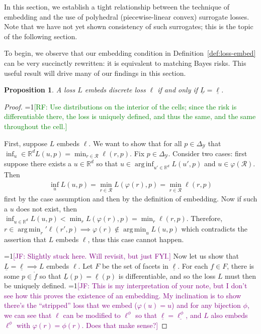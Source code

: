 \documentclass[12pt]{article}
\newcommand{\Comments}{1}
\newcommand{\mynote}[2]{\ifnum\Comments=1\textcolor{#1}{#2}\fi}
\newcommand{\raf}[1]{\mynote{green}{[RF: #1]}}
\newcommand{\jessie}[1]{\mynote{purple}{[JF: #1]}}
\newcommand{\reals}{\mathbb{R}}
\newcommand{\simplex}{\Delta_\Y}
\newcommand{\R}{\mathcal{R}}
\newcommand{\Y}{\mathcal{Y}}
\newcommand{\risk}[1]{\underline{#1}}
\newcommand{\inter}[1]{\mathring{#1}}%
\DeclareMathOperator*{\argmin}{arg\,min}
\DeclareMathOperator*{\arginf}{arg\,inf}
\newtheorem{proposition}{Proposition}
\begin{document}
In this section, we establish a tight relationship between the technique of embedding and the use of polyhedral (piecewise-linear convex) surrogate losses.
Note that we have not yet shown consistency of such surrogates; this is the topic of the following section.

To begin, we observe that our embedding condition in Definition~\ref{def:loss-embed} can be very succinctly rewritten: it is equivalent to matching Bayes risks.
This useful result will drive many of our findings in this section.

\begin{proposition}\label{prop:embed-bayes-risks}
  A loss $L$ embeds discrete loss $\ell$ if and only if $\risk{L}=\risk{\ell}$.
\end{proposition}
\begin{proof}
  \raf{Use distributions on the interior of the cells; since the risk is differentiable there, the loss is uniquely defined, and thus the same, and the same throughout the cell.}
  
  First, suppose $L$ embeds $\ell$.
  We want to show that for all $p \in \simplex$ that $\inf_u\in\reals^d L(u,p) = \min_{r \in \R} \ell(r, p)$.
  Fix $p \in \simplex$.
  Consider two cases: first suppose there exists a $u \in \reals^d$ so that $u \in \arginf_{u' \in \reals^d}L(u',p)$ and $u \in \varphi(\R)$.
  Then 
  \begin{align*}
  \inf_u L(u,p) = \min_{r \in \R} L(\varphi(r), p) = \min_{r \in \R} \ell(r, p)
  \end{align*}
   first by the case assumption and then by the definition of embedding.
  Now if such a $u$ does not exist, then $\inf_{u \in \reals^d}L(u,p) < \min_r L(\varphi(r), p) = \min_r \ell(r,p)$.
  Therefore, $r \in \argmin_r' \ell(r', p) \implies \varphi(r) \not \in \argmin_u L(u,p)$ which contradicts the assertion that $L$ embeds $\ell$, thus this case cannot happen.
  
  \jessie{Slightly stuck here.  Will revisit, but just FYI.}
  Now let us show that $\risk{L} = \risk{\ell} \implies L$ embeds $\ell$.
  Let $F$ be the set of facets in $\risk{\ell}$.
  For each $f \in F$, there is some $p \in \inter{f}$ so that $\risk{L}(p) = \risk{\ell}(p)$ is differentiable, and so the loss $L$ must then be uniquely defined.
  \jessie{This is my interpretation of your note, but I don't see how this proves the existence of an embedding.  My inclination is to show there's the ``stripped'' loss that we embed ($\varphi(u) = u$) and for any bijection $\phi$, we can see that $\ell$ can be modified to $\ell^\phi$ so that $\risk{\ell} = \risk{\ell^\phi}$, and $L$ also embeds $\ell^\phi$ with $\varphi(r) = \phi(r)$.  Does that make sense?}

\end{proof}
\end{document}
